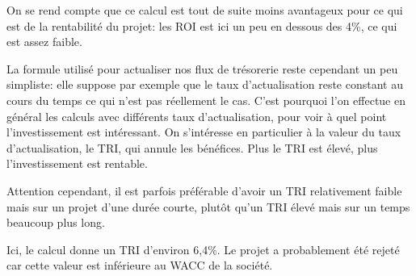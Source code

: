 On se rend compte que ce calcul est tout de suite moins 
avantageux pour ce qui est de la rentabilité du projet: 
les ROI est ici un peu en dessous des 4\%, ce qui est 
assez faible.

La formule utilisé pour actualiser nos flux de trésorerie 
reste cependant un peu simpliste: elle suppose par exemple 
que le taux d'actualisation reste constant au cours du temps 
ce qui n'est pas réellement le cas. 
C'est pourquoi l'on effectue en général les calculs avec 
différents taux d'actualisation, pour voir à quel point 
l'investissement est intéressant. 
On s'intéresse en 
particulier à la valeur du taux d'actualisation, le TRI, qui 
annule les bénéfices. Plus le TRI est élevé, plus 
l'investissement est rentable.

Attention cependant, il est parfois préférable d'avoir 
un TRI relativement faible mais sur un projet d'une durée 
courte, plutôt qu'un TRI élevé mais sur un temps beaucoup 
plus long.

Ici, le calcul donne un TRI d'environ 6,4\%. 
Le projet a probablement été rejeté car cette valeur est 
inférieure au WACC de la société.



